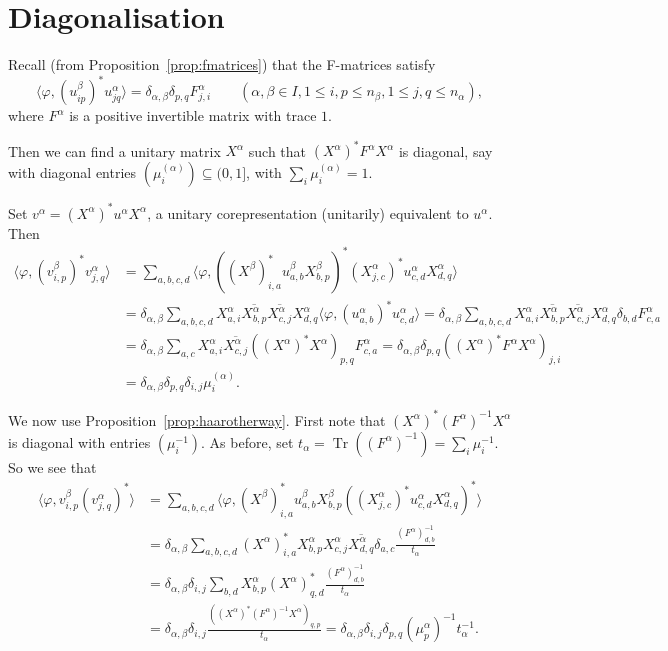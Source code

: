 \documentclass[twoside,a4paper,12pt]{article}
\theoremstyle{plain}
\theoremstyle{definition}
\newcommand{\ip}[2]{\langle #1,#2 \rangle}
\newcommand{\tr}{\operatorname{Tr}}
\begin{document}
\section{Diagonalisation}\label{sec:diag}

Recall (from Proposition~\ref{prop:fmatrices}) that the F-matrices satisfy
\[ \ip{\varphi}{(u^\beta_{ip})^* u^\alpha_{jq}}
= \delta_{\alpha,\beta} \delta_{p,q} F^\alpha_{j,i}
\qquad (\alpha,\beta\in I, 1\leq i,p\leq n_\beta, 1\leq j,q\leq n_\alpha), \]
where $F^\alpha$ is a positive invertible matrix with trace $1$.

Then we can find a unitary matrix $X^\alpha$ such that $(X^\alpha)^* F^\alpha
X^\alpha$ is diagonal, say with diagonal entries $(\mu^{(\alpha)}_i)
\subseteq (0,1]$, with $\sum_i \mu^{(\alpha)}_i = 1$.

Set $v^\alpha = (X^\alpha)^* u^\alpha X^\alpha$, a unitary corepresentation
(unitarily) equivalent to $u^\alpha$.  Then
\begin{align*} \ip{\varphi}{(v^\beta_{i,p})^* v^\alpha_{j,q}}
&= \sum_{a,b,c,d} \ip{\varphi}{( (X^\beta)^*_{i,a} u^\beta_{a,b} X^\beta_{b,p} )^*
(X^\alpha_{j,c})^*  u^\alpha_{c,d} X^\alpha_{d,q}} \\
&= \delta_{\alpha,\beta} \sum_{a,b,c,d} X^\alpha_{a,i} \overline{ X^\alpha_{b,p} }
\overline{ X^\alpha_{c,j} } X^\alpha_{d,q} \ip{\varphi}{(u^\alpha_{a,b})^*
u^\alpha_{c,d}}
= \delta_{\alpha,\beta} \sum_{a,b,c,d} X^\alpha_{a,i} \overline{ X^\alpha_{b,p} }
\overline{ X^\alpha_{c,j} } X^\alpha_{d,q} \delta_{b,d} F^\alpha_{c,a} \\
&= \delta_{\alpha,\beta} \sum_{a,c} X^\alpha_{a,i}
\overline{ X^\alpha_{c,j} } ((X^\alpha)^* X^\alpha)_{p,q} F^\alpha_{c,a}
= \delta_{\alpha,\beta} \delta_{p,q} ((X^\alpha)^* F^\alpha X^\alpha)_{j,i} \\
&= \delta_{\alpha,\beta} \delta_{p,q} \delta_{i,j} \mu^{(\alpha)}_i.
\end{align*}

We now use Proposition~\ref{prop:haarotherway}.  First note that
$(X^\alpha)^*(F^\alpha)^{-1}X^\alpha$ is diagonal with entries $(\mu_i^{-1})$.
As before, set $t_\alpha = \tr((F^\alpha)^{-1}) = \sum_i \mu_i^{-1}$.
So we see that
\begin{align*} \ip{\varphi}{v^\beta_{i,p} (v^\alpha_{j,q})^*}
&= \sum_{a,b,c,d} \ip{\varphi}{ (X^\beta)^*_{i,a} u^\beta_{a,b} X^\beta_{b,p} 
((X^\alpha_{j,c})^*  u^\alpha_{c,d} X^\alpha_{d,q})^*} \\
&= \delta_{\alpha,\beta} \sum_{a,b,c,d} (X^\alpha)^*_{i,a} X^\alpha_{b,p}
X^\alpha_{c,j} \overline{ X^\alpha_{d,q} } \delta_{a,c}
\frac{ (F^\alpha)^{-1}_{d,b} }{t_\alpha} \\
&= \delta_{\alpha,\beta} \delta_{i,j} \sum_{b,d}  X^\alpha_{b,p}
(X^\alpha)^*_{q,d} \frac{ (F^\alpha)^{-1}_{d,b} }{t_\alpha} \\
&= \delta_{\alpha,\beta} \delta_{i,j}
\frac{ ((X^\alpha)^*(F^\alpha)^{-1}X^\alpha)_{q,p}}{t_\alpha}
= \delta_{\alpha,\beta} \delta_{i,j} \delta_{p,q} (\mu_p^\alpha)^{-1}
t_\alpha^{-1}.  \end{align*}
\end{document}
